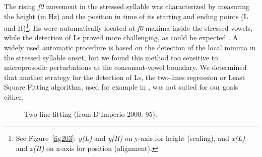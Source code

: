 The rising \textit{f0} movement in the stressed syllable was characterized by measuring the height (in Hz) and the position in time of its starting and ending points (L and H)\footnote{See Figure~\ref{fig203}: \textit{y(L)} and \textit{y(H)} on y-axis for height (scaling), and \textit{x(L)} and \textit{x(H)} on x-axis for position (alignment).}. Hs were automatically located at \textit{f0} maxima inside the stressed vowels, while the detection of Ls proved more challenging, as could be expected \citep{delgiudice2007comparing,petrone2009tonal}. A widely used automatic procedure is based on the detection of the local minima in the stressed syllable onset, but we found this method too sensitive to microprosodic perturbations at the consonant-vowel boundary. We determined that another strategy for the detection of Ls, the two-lines regression or Least Square Fitting algorithm, used for example in \citet[92-93]{dimperio2000role}, was not suited for our goals either.

\begin{figure}
\centering
{}
\caption{Two-line fitting (from D'Imperio 2000: 95).}
\label{fig204}\end{figure}

